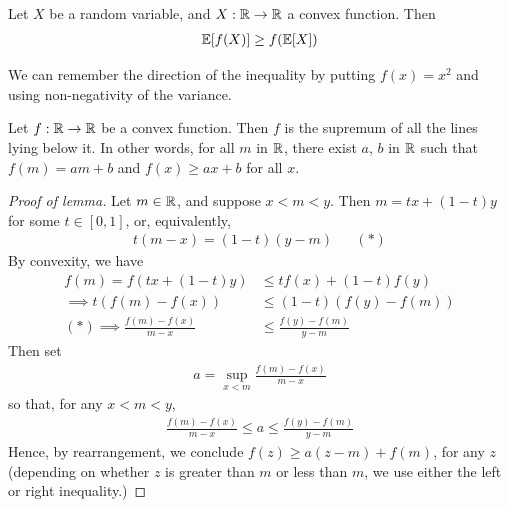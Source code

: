 \documentclass{../../template/note}
\begin{document}
    \begin{proposition}
        Let \(X\) be a random variable, and \(X: \mathbb R \to \mathbb R\) a convex function. Then
        \begin{align*}
            \mathbb E[f(X)] \geq f(\mathbb E[X])
        \end{align*}
    \end{proposition}
    
    \begin{remark*}
        We can remember the direction of the inequality by putting \(f(x) = x^2\) and using non-negativity of the variance.
    \end{remark*}
    
    \begin{lemma}
        Let \(f: \mathbb R \to \mathbb R\) be a convex function. Then \(f\) is the supremum of all the lines lying below it. In other words, for all \(m\) in \(\mathbb R\), there exist \(a\), \(b\) in \(\mathbb R\) such that \(f(m) = am + b\) and \(f(x) \geq ax + b\) for all \(x\).
    \end{lemma}
    
    \begin{proof}[Proof of lemma]
        Let \(m \in \mathbb R\), and suppose \(x < m < y\). Then \(m = tx + (1-t)y\) for some \(t \in [0, 1]\), or, equivalently,
        \begin{align*}
            t(m-x) = (1-t)(y-m) && (*)
        \end{align*}
        By convexity, we have
        \begin{align*}
            f(m) = f(tx + (1-t)y) &\leq tf(x) + (1-t)f(y) \\
            \implies t(f(m) - f(x)) &\leq (1-t)(f(y)-f(m)) \\
            (*) \implies \frac{f(m)-f(x)}{m-x} &\leq \frac{f(y)-f(m)}{y-m}
        \end{align*}
        Then set
        \begin{align*}
            a = \sup_{x < m} \frac{f(m)-f(x)}{m-x}
        \end{align*}
        so that, for any \(x < m < y\),
        \begin{align*}
            \frac{f(m)-f(x)}{m-x} \leq a \leq \frac{f(y)-f(m)}{y-m}
        \end{align*}
        Hence, by rearrangement, we conclude \(f(z) \geq a(z-m) + f(m)\), for any \(z\) (depending on whether \(z\) is greater than \(m\) or less than \(m\), we use either the left or right inequality.)        
    \end{proof}
    
\end{document}
